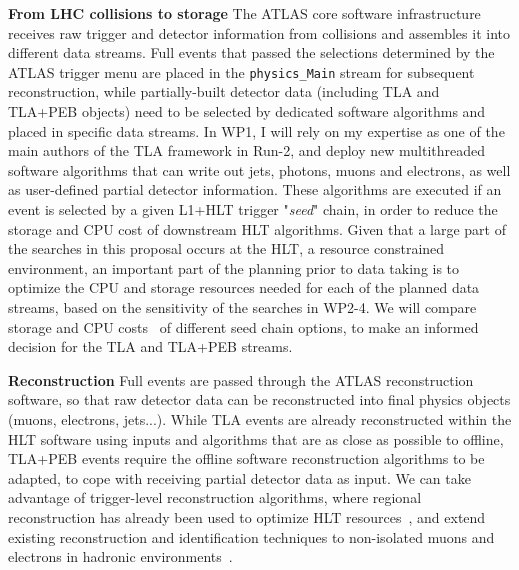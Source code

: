 \textbf{From LHC collisions to storage} The ATLAS core software infrastructure receives raw trigger and detector information from collisions and assembles it into different data streams. 
Full events that passed the selections determined by the ATLAS trigger menu are placed in the \texttt{physics\_Main} stream for subsequent reconstruction, while partially-built detector data (including TLA and TLA+PEB objects) need to be selected by dedicated software algorithms and placed in specific data streams. 
In WP1, I will rely on my expertise as one of the main authors of the TLA framework in Run-2, and deploy new multithreaded software algorithms that can write out jets, photons, muons and electrons, as well as user-defined partial detector information. 
These algorithms are executed if an event is selected by a given L1+HLT trigger "\textit{seed}" chain, in order to reduce the storage and CPU cost of downstream HLT algorithms. 
Given that a large part of the searches in this proposal occurs at the HLT, a resource constrained environment, an important part of the planning prior to data taking is to optimize the CPU and storage resources needed for each of the planned data streams, based on the sensitivity of the searches in WP2-4. 
We will compare storage and CPU costs~\cite{ToBeCited} %
of different seed chain options, to make an informed decision for the TLA and TLA+PEB streams. 

\textbf{Reconstruction} Full events are passed through the ATLAS reconstruction software, so that raw detector data can be reconstructed into final physics objects (muons, electrons, jets...). 
While TLA events are already reconstructed within the HLT software using inputs and algorithms that are as close as possible to offline, 
TLA+PEB events require the offline software reconstruction algorithms to be adapted, to cope with receiving partial detector data as input. 
We can take advantage of trigger-level reconstruction algorithms, where regional reconstruction has already been used to optimize HLT resources~\cite{ToBeCited}, %
and extend existing reconstruction and identification techniques to non-isolated muons and electrons in hadronic environments~\cite{ToBeCited}. %

